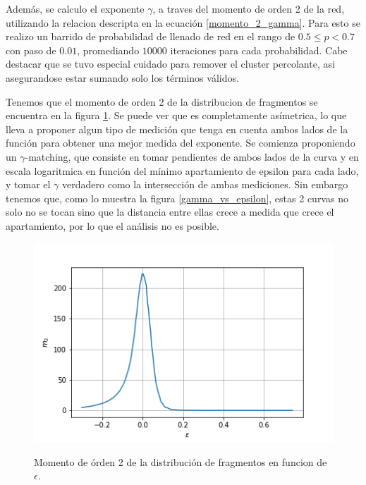 \documentclass[
 reprint,
 amsmath,amssymb,
 aps,
]{revtex4-1}
\begin{document}
Adem\'as, se calculo el exponente $\gamma$, a traves del momento de orden 2 de la red, utilizando la relacion descripta en la ecuaci\'on \ref{momento_2_gamma}. Para esto se realizo un barrido de probabilidad de llenado de red en el rango de $0.5 \leq p < 0.7$ con paso de $0.01$, promediando $10000$ iteraciones para cada probabilidad. Cabe destacar que se tuvo especial cuidado para remover el cluster percolante, asi asegurandose estar sumando solo los t\'erminos v\'alidos.

Tenemos que el momento de orden 2 de la distribucion de fragmentos se encuentra en la figura \ref{m_2_vs_epsilon}. Se puede ver que es completamente as\'imetrica, lo que lleva a proponer algun tipo de medici\'on que tenga en cuenta ambos lados de la funci\'on para obtener una mejor medida del exponente. Se comienza proponiendo un $\gamma$-matching, que consiste en tomar pendientes de ambos lados de la curva y en escala logaritmica en funci\'on del m\'inimo apartamiento de epsilon para cada lado, y tomar el $\gamma$ verdadero como la intersecci\'on de ambas mediciones.
Sin embargo tenemos que, como lo muestra la figura \ref{gamma_vs_epsilon}, estas 2 curvas no solo no se tocan sino que la distancia entre ellas crece a medida que crece el apartamiento, por lo que el an\'alisis no es posible.

\begin{figure}[ht]
\begin{center}
\includegraphics[scale=0.62]{../images/m_2_vs_epsilon.png} \\
\caption{Momento de \'orden 2 de la distribuci\'on de fragmentos en funcion de $\epsilon$.}\label{m_2_vs_epsilon}
\end{center}
\end{figure}
\end{document}
